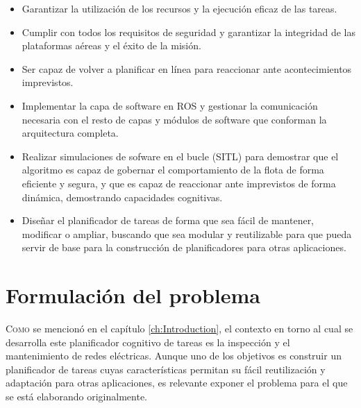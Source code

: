 \documentclass[fontsize=11pt, English=false, Español=true, Myfinal=true, twoside, numbers=noenddot]{scrbook}
\begin{document}
\begin{itemize}
    \item Garantizar la utilización de los recursos y la ejecución eficaz de las tareas.
    \item Cumplir con todos los requisitos de seguridad y garantizar la integridad de las plataformas aéreas y el éxito de la misión.
    \item Ser capaz de volver a planificar en línea para reaccionar ante acontecimientos imprevistos.
    \item Implementar la capa de software en \gls{ROS} y gestionar la comunicación necesaria con el resto de capas y módulos de software que conforman la arquitectura completa.
    \item Realizar simulaciones de sofware en el bucle (\gls{SITL}) para demostrar que el algoritmo es capaz de gobernar el comportamiento de la flota de forma eficiente y segura, y que es capaz de reaccionar ante imprevistos de forma dinámica, demostrando capacidades cognitivas.
    \item Diseñar el planificador de tareas de forma que sea fácil de mantener, modificar o ampliar, buscando que sea modular y reutilizable para que pueda servir de base para la construcción de planificadores para otras aplicaciones.
\end{itemize}

%
%
% 
%
%
%
\chapter{Formulación del problema}
\label{ch:ProblemFormulation}
\lettrine[lraise=-0.1, lines=2, loversize=0.2]{C}{omo} se mencionó en el capítulo \ref{ch:Introduction}, el contexto en torno al cual se desarrolla este planificador cognitivo de tareas es la inspección y el mantenimiento de redes eléctricas. Aunque uno de los objetivos es construir un planificador de tareas cuyas características permitan su fácil reutilización y adaptación para otras aplicaciones, es relevante exponer el problema para el que se está elaborando originalmente. 
\end{document}

